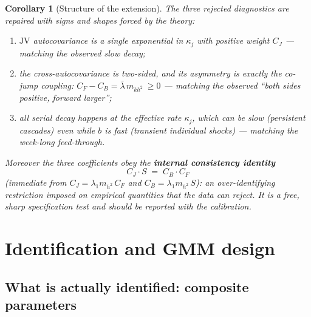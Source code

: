 \documentclass[11pt]{report}
\newtheorem{corollary}[theorem]{Corollary}
\theoremstyle{definition}
\theoremstyle{remark}
\newcommand{\JV}{\mathrm{JV}}
\newcommand{\mh}{m_{h^{2}}}
\newcommand{\mkh}{m_{kh^{2}}}
\begin{document}
\begin{corollary}[Structure of the extension]\label{cor:structure}
The three rejected diagnostics are repaired with signs and shapes forced by
the theory:
\begin{enumerate}
\item $\JV$ autocovariance is a single exponential in $\kappa_{j}$ with
positive weight $C_{J}$ --- matching the observed slow decay;
\item the cross-autocovariance is \emph{two-sided}, and its asymmetry is
exactly the co-jump coupling:
$C_{F}-C_{B}=\bar\lambda\,\mkh\ \ge 0$ --- matching the observed
``both sides positive, forward larger'';
\item all serial decay happens at the effective rate $\kappa_{j}$, which can
be slow (persistent cascades) even while $b$ is fast (transient individual
shocks) --- matching the week-long feed-through.
\end{enumerate}
Moreover the three coefficients obey the \textbf{internal consistency
identity}
\[
\boxed{\;C_{J}\cdot S \;=\; C_{B}\cdot C_{F}\;}
\]
(immediate from $C_J=\lambda_1\mh\,C_F$ and $C_B=\lambda_1\mh\,S$): an
over-identifying restriction imposed on \emph{empirical} quantities that the
data can reject. It is a free, sharp specification test and should be
reported with the calibration.
\end{corollary}

\chapter{Identification and GMM design}
\label{ch:gmm}

\section{What is actually identified: composite parameters}
\end{document}
